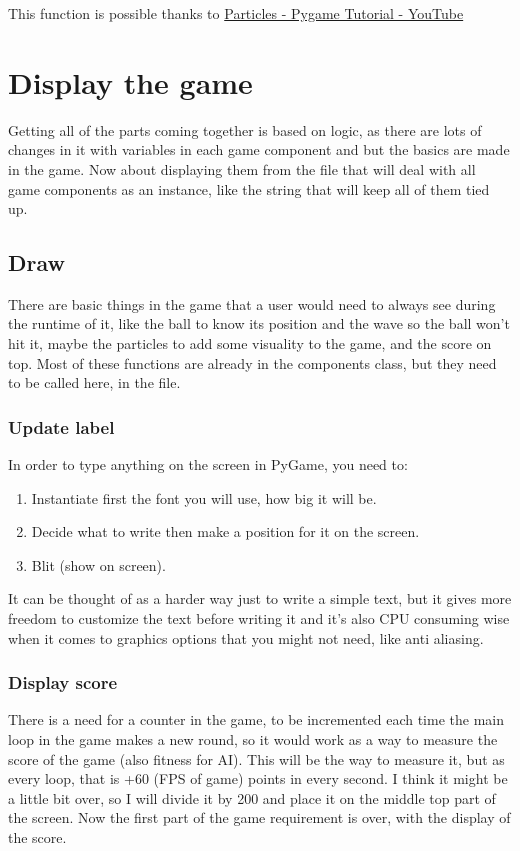This function is possible thanks to \href{https://www.youtube.com/watch?v=F69-t33e8tk}{Particles - Pygame Tutorial - YouTube}

\section{Display the game}\label{display-the-game}
Getting all of the parts coming together is based on logic, as there are lots of changes in it with variables in each game component  and  but the basics are made in the game. Now about displaying them from the  file that will deal with all game components as an instance, like the string that will keep all of them tied up.

\subsection{Draw}\label{draw}
There are basic things in the game that a user would need to always see during the runtime of it, like the ball to know its position and the wave so the ball won't hit it, maybe the particles to add some visuality to the game, and the score on top. Most of these functions are already in the components class, but they need to be called here, in the  file.

\subsubsection{Update label}

In order to type anything on the screen in PyGame, you need to:
\begin{enumerate}
	\item Instantiate first the font you will use, how big it will be.
	\item Decide what to write then make a position for it on the screen.
	\item Blit (show on screen).
\end{enumerate}

It can be thought of as a harder way just to write a simple text, but it gives more freedom to customize the text before writing it and it's also CPU consuming wise when it comes to graphics options that you might not need, like anti aliasing.

\subsubsection{Display score} \label{display-score}
There is a need for a counter in the game, to be incremented each time the main  loop in the game makes a new round, so it would work as a way to measure the score of the game (also fitness for AI). This  will be the way to measure it, but as every loop, that is +60 (FPS of game) points in every second. I think it might be a little bit over, so I will divide it by 200 and place it on the middle top part of the screen. Now the first part of the game requirement is over, with the display of the score.

